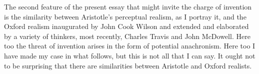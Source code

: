 The second feature of the present essay that might invite the charge of invention is the similarity between Aristotle's perceptual realism, as I portray it, and the Oxford realism inaugurated by John Cook Wilson and extended and elaborated by a variety of thinkers, most recently, Charles Travis and John McDowell. Here too the threat of invention arises in the form of potential anachronism. Here too I have made my case in what follows, but this is not all that I can say. It ought not to be surprising that there are similarities between Aristotle and Oxford realists. 

